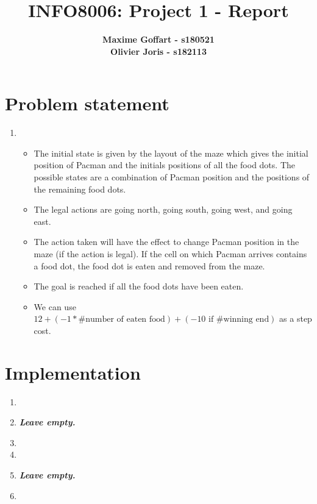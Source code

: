 \documentclass{article}
\begin{document}

\title{\Large{INFO8006: Project 1 - Report}}
\vspace{1cm}
\author{\small{\bf Maxime Goffart - s180521} \\ \small{\bf Olivier Joris - s182113}}

\maketitle


\section{Problem statement}

\begin{enumerate}[label=\alph*.,leftmargin=1.35em]
    \item
    	\begin{itemize}
    		\item The initial state is given by the layout of the maze which gives the initial position of Pacman and the initials positions of all the food dots. The possible states are a combination of Pacman position and the positions of the remaining food dots.
    		\item The legal actions are going north, going south, going west, and going east.
    		\item The action taken will have the effect to change Pacman position in the maze (if the action is legal). If the cell on which Pacman arrives contains a food dot, the food dot is eaten and removed from the maze.
    		\item The goal is reached if all the food dots have been eaten.
    		\item We can use $12 + (-1 * \#\text{number of eaten food}) + (-10 \text{ if \#winning end})$ as a step cost.
    	\end{itemize}
\end{enumerate}

\section{Implementation}

\begin{enumerate}[label=\alph*.,leftmargin=1.35em]
    \item
    \item \textbf{{\it Leave empty.}}
    \item
    \item
    \item \textbf{{\it Leave empty.}}
    \item
\end{enumerate}
\end{document}
